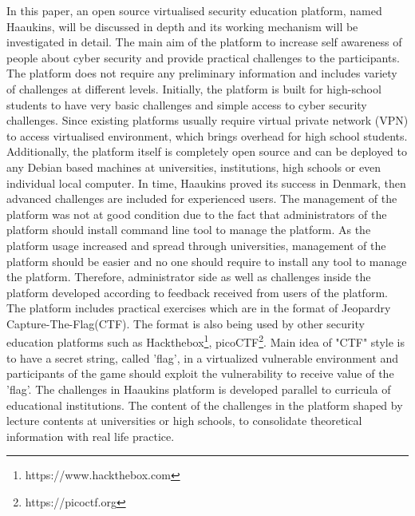 In this paper, an open source virtualised security education platform, named Haaukins, will be discussed in depth and its working mechanism will be investigated in detail. The main aim of the platform to increase self awareness of people about cyber security and provide practical challenges to the participants. The platform does not require any preliminary information and includes variety of challenges at different levels.
Initially, the platform is built for high-school students to have very basic challenges and simple access to cyber security challenges. Since existing platforms usually require virtual private network (VPN) to access virtualised environment, which brings overhead for high school students. Additionally, the platform itself is completely open source and can be deployed to any Debian based machines at universities, institutions, high schools or even individual local computer. In time, Haaukins proved its success in Denmark, then advanced challenges are included for experienced users. The management of the platform was not at good condition due to the fact that administrators of the platform should install command line tool to manage the platform. As the platform usage increased and spread through universities, management of the platform should be easier and no one should require to install any tool to manage the platform. Therefore, administrator side as well as challenges inside the platform developed according to feedback received from users of the platform. The platform includes practical exercises which are in the format of Jeopardry Capture-The-Flag(CTF).\cite{191767} The format is also being used by other security education platforms  such as Hackthebox\footnote{https://www.hackthebox.com}, picoCTF\footnote{https://picoctf.org}. Main idea of "CTF" style is to have a secret string, called 'flag', in a virtualized vulnerable environment and participants of the game should exploit the vulnerability to receive value of  the 'flag'. The challenges in Haaukins platform is developed parallel to curricula of educational institutions. The content of the challenges in the platform shaped by lecture contents at universities or high schools, to consolidate theoretical information with real life practice. 
